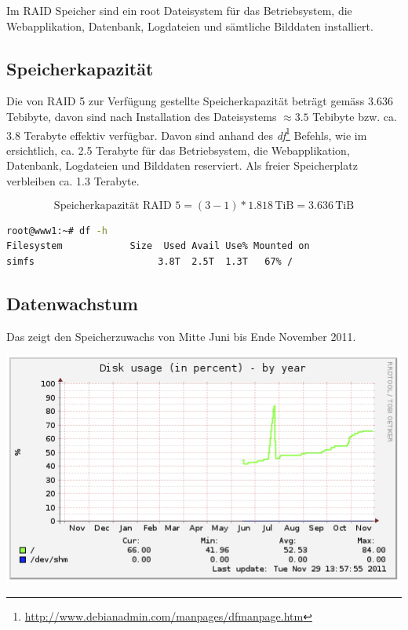 Im RAID Speicher sind ein root Dateisystem für das Betriebsystem, die Webapplikation, Datenbank, Logdateien und sämtliche Bilddaten installiert.

\subsection{Speicherkapazität}
Die von RAID 5 zur Verfügung gestellte Speicherkapazität beträgt gemäss  3.636 Tebibyte, davon sind nach Installation des Dateisystems $\approx 3.5$ Tebibyte bzw. ca. 3.8 Terabyte effektiv verfügbar. Davon sind anhand des \textit{df}\footnote{\url{http://www.debianadmin.com/manpages/dfmanpage.htm}}
 Befehls,  wie im  ersichtlich, ca. 2.5 Terabyte für das Betriebsystem, die Webapplikation, Datenbank, Logdateien und Bilddaten reserviert. Als freier Speicherplatz verbleiben ca. 1.3 Terabyte.

\begin{equation}
\mbox{Speicherkapazität RAID 5}= (3 - 1) * 1.818  \, \mathrm{TiB} =  3.636 \, \mathrm{TiB}
\label{eqn:RAID 5-3disk}
\end{equation}

\begin{lstlisting}[label=df, language=Bash, caption=Report Dateisystem Speicherplatz Belegung in Dezimal Prefix ]
root@www1:~# df -h
Filesystem            Size  Used Avail Use% Mounted on
simfs                      3.8T  2.5T  1.3T   67% /
\end{lstlisting}

\subsection{Datenwachstum}
Das  zeigt den Speicherzuwachs von Mitte Juni bis Ende November 2011.

\begin{center}
\includegraphics[width=\linewidth, keepaspectratio = true]{media/disk-usage-by-year.png}
\end{center}

